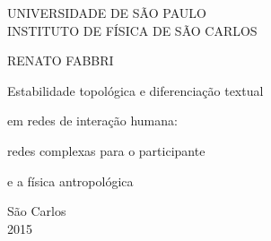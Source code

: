 \documentclass[a4paper,openright,12pt]{report} %
\begin{document}




\pagestyle{fancy}


\thispagestyle{empty}

\vspace{0.5cm}

\begin{center} 
\LARGE{UNIVERSIDADE DE SÃO PAULO}  \\
\LARGE{INSTITUTO DE FÍSICA DE SÃO CARLOS}
\end{center}

\vspace{6.0cm}

\centerline{\LARGE{RENATO FABBRI}}

\vspace{3.0cm}

\linespread{1.3}


\centerline{\Huge{Estabilidade topológica e diferenciação textual}} 
\centerline{\Huge{em redes de interação humana:}} 
\vspace{0.5cm}
\centerline{\Huge{redes complexas para o participante}}
\centerline{\Huge{e a física antropológica}}


\vspace{6.5cm}

\begin{center}
\Large{S\~ao Carlos}\\
\Large{2015}
\end{center}



\newpage\ \thispagestyle{empty}  \newpage\thispagestyle{empty}

\setcounter{page}{1} %
\end{document}
